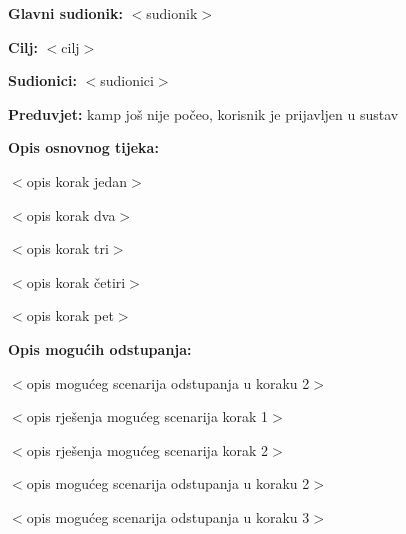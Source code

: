 					\noindent {}
					\begin{packed_item}
						
						\item \textbf{Glavni sudionik: }$<$sudionik$>$
						\item  \textbf{Cilj:} $<$cilj$>$
						\item  \textbf{Sudionici:} $<$sudionici$>$
						\item  \textbf{Preduvjet:} kamp još nije počeo, korisnik je prijavljen u sustav
						\item  \textbf{Opis osnovnog tijeka:}
						
						\item[] \begin{packed_enum}
							
							\item $<$opis korak jedan$>$
							\item $<$opis korak dva$>$
							\item $<$opis korak tri$>$
							\item $<$opis korak četiri$>$
							\item $<$opis korak pet$>$
						\end{packed_enum}
						
						\item  \textbf{Opis mogućih odstupanja:}
						
						\item[] \begin{packed_item}
							
							\item[2.a] $<$opis mogućeg scenarija odstupanja u koraku 2$>$
							\item[] \begin{packed_enum}
								
								\item $<$opis rješenja mogućeg scenarija korak 1$>$
								\item $<$opis rješenja mogućeg scenarija korak 2$>$
								
							\end{packed_enum}
							\item[2.b] $<$opis mogućeg scenarija odstupanja u koraku 2$>$
							\item[3.a] $<$opis mogućeg scenarija odstupanja  u koraku 3$>$
							
						\end{packed_item}
					\end{packed_item}
				
